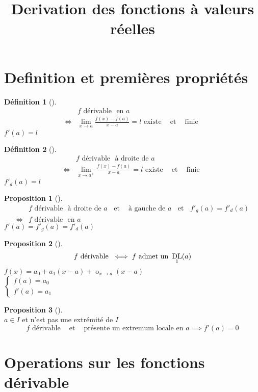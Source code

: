 \documentclass{article}
\title{Derivation des fonctions à valeurs réelles}
\newcommand{\et}{\;\;\text{ et }\;\;}
\newcommand{\lm}{\lim\limits}
\newcommand{\en}{\text{ en }}
\newcommand{\drt}{\text{ à droite de }}
\newcommand{\gch}{\text{ à gauche de }}
\newcommand{\drv}{\text{ dérivable }}
\newcommand{\e}{\!\!}
\newcommand{\exs}{\text{ existe }}
\newcommand{\fn}{\text{ finie }}
\newcommand{\ngl}[2]{\negl_{#1}\!\!\!(#2)}
\DeclareMathOperator{\dl}{DL}
\DeclareMathOperator*{\negl}{o}
\theoremstyle{definition}
\newtheorem*{prop}{Proposition}
\newtheorem*{defin}{Définition}
\theoremstyle{remark}
\theoremstyle{plain}
\newenvironment{prp}[1][]
{\begin{prop}[#1]\quad\\}
{\end{prop}}
\newenvironment{dfn}[1][]
{\begin{defin}[#1]\quad\\}
{\end{defin}}
\begin{document}
\maketitle
\pagebreak

\section{Definition et premières propriétés}
\quad
\begin{dfn}
\begin{align*}
        &f \drv \e \en a \\
\iff    &\lm_{x \to a} \frac{f(x) - f(a)}{x - a} = l \exs \e \et \e \fn
\end{align*}
$f'(a) = l$
\end{dfn}

\begin{dfn}
\begin{align*}
        &f \drv \e \drt a \\
\iff    &\lm_{x \to a^+} \frac{f(x) - f(a)}{x - a} = l \exs \e \et \e \fn
\end{align*}
$f'_d(a) = l$
\end{dfn}

\begin{prp}
\begin{align*}
        &f \drv \e \drt a \et \e \gch a \et f'_g(a) = f'_d(a) \\
\iff    &f \drv \e \en a
\end{align*}
$f'(a) = f'_g(a) = f'_d(a)$
\end{prp}

\begin{prp}
\[
    f \drv \iff f \text{ admet un } \dl_1(a) \\
\]
$f(x) = a_0 + a_1(x - a) + \ngl{x \to a}{x - a}$ \\
$
\begin{cases}
    f(a) = a_0 \\
    f'(a) = a_1
\end{cases}
$
\end{prp}

\begin{prp}
$a \in I$ et n'est pas une extrémité de $I$ \\
\[
    f \drv \e \et \text{ présente un extremum locale en } a
    \implies f'(a) = 0
\]
\end{prp}

\pagebreak
\section{Operations sur les fonctions dérivable}
\end{document}
